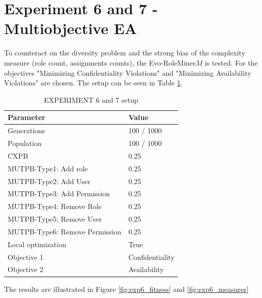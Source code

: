 \newpage
\section{Experiment 6 and 7 - Multiobjective EA}
\label{sec:exp7and7}
To counteract on the diversity problem and the strong bias of the complexity measure (role count, assignments counts), the Evo-RoleMiner$M$ is tested. For the objectives "Minimizing Confidentiality Violations" and "Minimizing Availability Violations" are chosen. The setup can be seen in Table \ref{tab:setup4}.

\begin{table}[H]
	\centering
	\begin{tabular}{|l|l|}
		\hline
		\rowcolor{myGray} 
		\textbf{Parameter}              & \textbf{Value}    \\ \hline
		Generations                     & 100 / 1000       	\\ \hline
		Population                      & 100 / 1000        \\ \hline
		CXPB                            & 0.25              \\ \hline
		MUTPB-Type1: Add role           & 0.25              \\ \hline
		MUTPB-Type2: Add User           & 0.25              \\ \hline
		MUTPB-Type3: Add Permission     & 0.25              \\ \hline
		MUTPB-Type4: Remove Role        & 0.25              \\ \hline
		MUTPB-Type5: Remove User        & 0.25              \\ \hline
		MUTPB-Type6: Remove Permission  & 0.25              \\ \hline
		Local optimization              & True        		\\ \hline
		Objective 1					    & Confidentiality   \\ \hline
		Objective 2					    & Availability     	\\ \hline
	\end{tabular}
	\caption{EXPERIMENT 6 and 7 setup}
	\label{tab:setup4}
\end{table}

The results are illustrated in Figure \ref{fig:exp6_fitness} and \ref{fig:exp6_measures} 

